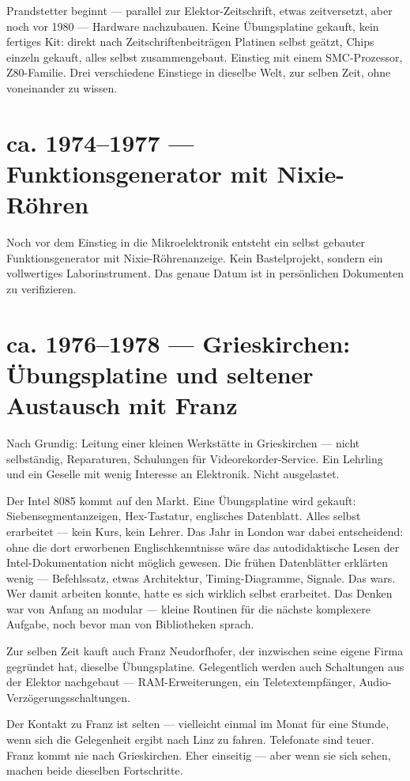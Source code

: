 \documentclass[11pt]{report}
\begin{document}
Prandstetter beginnt --- parallel zur Elektor-Zeitschrift, etwas zeitversetzt, aber noch vor 1980 --- Hardware nachzubauen. Keine Übungsplatine gekauft, kein fertiges Kit: direkt nach Zeitschriftenbeiträgen Platinen selbst geätzt, Chips einzeln gekauft, alles selbst zusammengebaut. Einstieg mit einem SMC-Prozessor, Z80-Familie. Drei verschiedene Einstiege in dieselbe Welt, zur selben Zeit, ohne voneinander zu wissen.

\section{ca. 1974--1977 --- Funktionsgenerator mit Nixie-Röhren}

Noch vor dem Einstieg in die Mikroelektronik entsteht ein selbst gebauter Funktionsgenerator mit Nixie-Röhrenanzeige. Kein Bastelprojekt, sondern ein vollwertiges Laborinstrument. Das genaue Datum ist in persönlichen Dokumenten zu verifizieren.

\section{ca. 1976--1978 --- Grieskirchen: Übungsplatine und seltener Austausch mit Franz}

Nach Grundig: Leitung einer kleinen Werkstätte in Grieskirchen --- nicht selbständig, Reparaturen, Schulungen für Videorekorder-Service. Ein Lehrling und ein Geselle mit wenig Interesse an Elektronik. Nicht ausgelastet.

Der Intel 8085 kommt auf den Markt. Eine Übungsplatine wird gekauft: Siebensegmentanzeigen, Hex-Tastatur, englisches Datenblatt. Alles selbst erarbeitet --- kein Kurs, kein Lehrer. Das Jahr in London war dabei entscheidend: ohne die dort erworbenen Englischkenntnisse wäre das autodidaktische Lesen der Intel-Dokumentation nicht möglich gewesen. Die frühen Datenblätter erklärten wenig --- Befehlssatz, etwas Architektur, Timing-Diagramme, Signale. Das wars. Wer damit arbeiten konnte, hatte es sich wirklich selbst erarbeitet. Das Denken war von Anfang an modular --- kleine Routinen für die nächste komplexere Aufgabe, noch bevor man von Bibliotheken sprach.

Zur selben Zeit kauft auch Franz Neudorfhofer, der inzwischen seine eigene Firma gegründet hat, dieselbe Übungsplatine. Gelegentlich werden auch Schaltungen aus der Elektor nachgebaut --- RAM-Erweiterungen, ein Teletextempfänger, Audio-Verzögerungsschaltungen.

Der Kontakt zu Franz ist selten --- vielleicht einmal im Monat für eine Stunde, wenn sich die Gelegenheit ergibt nach Linz zu fahren. Telefonate sind teuer. Franz kommt nie nach Grieskirchen. Eher einseitig --- aber wenn sie sich sehen, machen beide dieselben Fortschritte.
\end{document}
